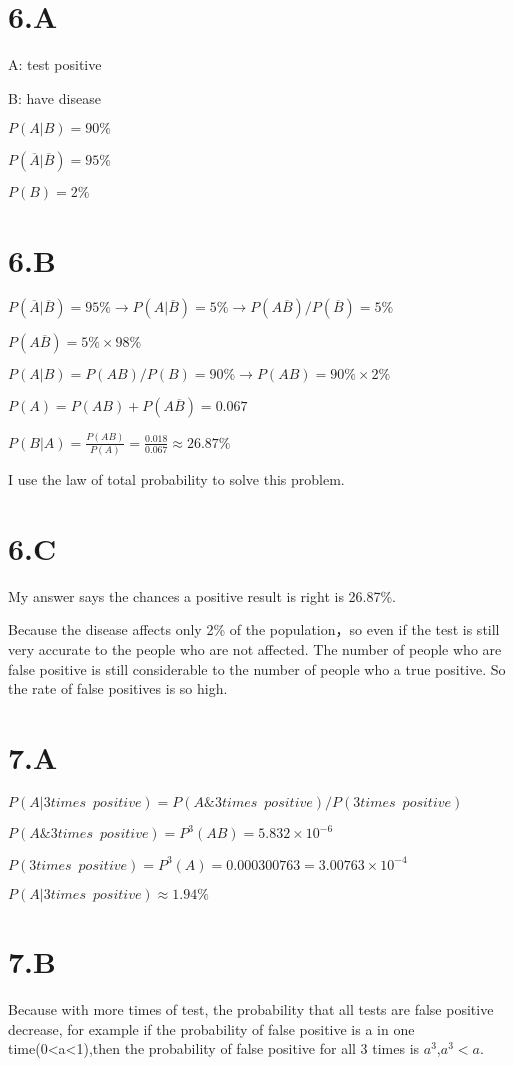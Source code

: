 \documentclass[11pt]{article}
\begin{document}
\section*{6.A}\noindent

A: test positive

B: have disease

$P(A|B)=90\%$

$P(\overline{A}|\overline{B})=95\%$

$P(B)=2\%$

\section*{6.B}\noindent

$P(\overline{A}|\overline{B})=95\%\rightarrow P(A|\overline{B})=5\%\rightarrow P(A\overline{B})/P(\overline{B})=5\%$

$P(A\overline{B})=5\%\times 98\%$

$P(A|B)=P(AB)/P(B)=90\%\rightarrow P(AB)=90\%\times 2\%$

$P(A)=P(AB)+P(A\overline{B})=0.067$

$P(B|A)=\frac{P(AB)}{P(A)}=\frac{0.018}{0.067}\approx26.87\%$

I use the law of total probability to solve this problem.

\section*{6.C}\noindent

My answer says the chances a positive result is right is 26.87\%.

Because the disease affects only 2\% of the population，so even if the test is still very accurate to the people who are not affected. The number of people who are false positive is still considerable to the number of people who a true positive. So the rate of false positives  is so high.


\section*{7.A}\noindent

$P(A|3times\enspace positive)=P(A\&3times\enspace positive)/P(3times\enspace positive)$

$P(A\&3times\enspace positive)=P^3(AB)=5.832\times 10^{-6}$

$P(3times\enspace positive)=P^3(A)=0.000300763=3.00763\times 10^{-4}$

$P(A|3times\enspace positive)\approx 1.94\%$

\section*{7.B}\noindent

Because with more times of test, the probability that all tests are false positive decrease, for example if the probability of false positive is a in one time(0<a<1),then the probability of false positive for all 3 times is $a^3$,$a^3<a$.
\end{document}
